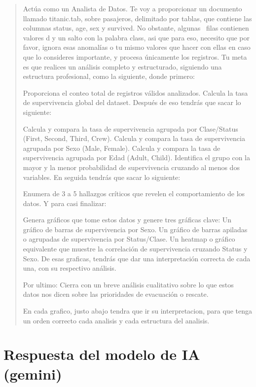 \documentclass[letterpaper,11pt]{article}
\begin{document}
\begin{quote}
  Actúa como un Analista de Datos.
  Te voy a proporcionar un documento llamado titanic.tab, sobre pasajeros, delimitado por tablas, que contiene las columnas status, age, sex y survived. No obstante, algunas  filas contienen valores d y un salto con la palabra class, asi que para eso, necesito que por favor, ignora esas anomalías o tu mismo valores que hacer con ellas en caso que lo consideres importante, y procesa únicamente los registros.
  Tu meta es que realices un análisis completo y estructurado, siguiendo una estructura profesional, como la siguiente, donde primero:

  Proporciona el conteo total de registros válidos analizados.
  Calcula la tasa de supervivencia global del dataset.
  Después de eso tendrás que sacar lo siguiente:

  Calcula y compara la tasa de supervivencia agrupada por Clase/Status (First, Second, Third, Crew).
  Calcula y compara la tasa de supervivencia agrupada por Sexo (Male, Female).
  Calcula y compara la tasa de supervivencia agrupada por Edad (Adult, Child).
  Identifica el grupo con la mayor y la menor probabilidad de supervivencia cruzando al menos dos variables.
  En seguida tendrás que sacar lo siguiente:

  Enumera de 3 a 5 hallazgos críticos que revelen el comportamiento de los datos.
  Y para casi finalizar:

  Genera gráficos que tome estos datos y genere tres gráficas clave:
  Un gráfico de barras de supervivencia por Sexo.
  Un gráfico de barras apiladas o agrupadas de supervivencia por Status/Clase.
  Un heatmap o gráfico equivalente que muestre la correlación de supervivencia cruzando Status y Sexo.
  De esas graficas, tendrás que dar una interpretación correcta de cada una, con su respectivo análisis.

  Por ultimo:
  Cierra con un breve análisis cualitativo sobre lo que estos datos nos dicen sobre las prioridades de evacuación o rescate.

  En cada grafico, justo abajo tendra que ir su interpretacion, para que tenga un orden correcto cada analisis y cada estructura del analisis.
\end{quote}

\newpage
\section{Respuesta del modelo de IA (gemini)}
\end{document}
